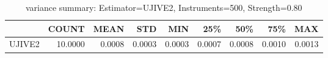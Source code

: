 \begin{table}[ht]
\centering
\caption{variance summary: Estimator=UJIVE2, Instruments=500, Strength=0.80}
\begin{tabular}{lrrrrrrrr}
\toprule
 & COUNT & MEAN & STD & MIN & 25\% & 50\% & 75\% & MAX \\
\midrule
UJIVE2 & 10.0000 & 0.0008 & 0.0003 & 0.0003 & 0.0007 & 0.0008 & 0.0010 & 0.0013 \\
\bottomrule
\end{tabular}
\end{table}
